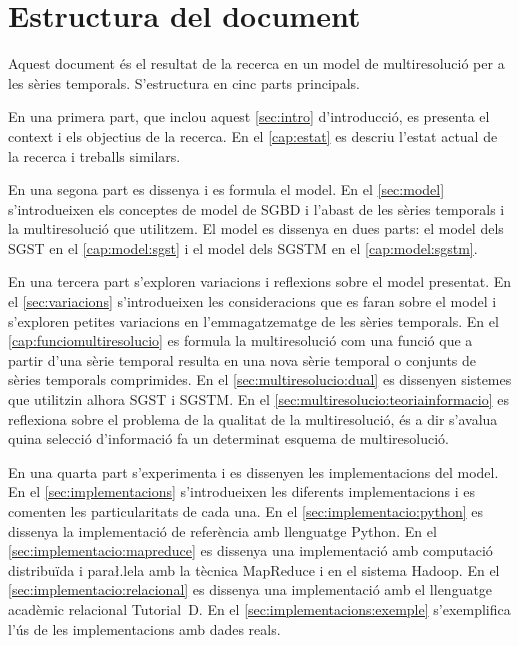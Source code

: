 











\section{Estructura del document}


Aquest document és el resultat de la recerca en un
model de multiresolució per a les sèries temporals. S'estructura en
cinc parts principals.

En una primera part, que inclou aquest \autoref{sec:intro}
d'introducció, es presenta el context i els objectius de la
recerca. En el \autoref{cap:estat} es descriu l'estat actual de la
recerca i treballs similars.

En una segona part es dissenya i es formula el model.  En el
\autoref{sec:model} s'introdueixen els conceptes de model de
\gls{SGBD} i l'abast de les sèries temporals i la multiresolució que
utilitzem.  El model es dissenya en dues parts: el model dels
\gls{SGST} en el \autoref{cap:model:sgst} i el model dels \gls{SGSTM}
en el \autoref{cap:model:sgstm}.


En una tercera part s'exploren variacions i reflexions sobre el model
presentat. En el \autoref{sec:variacions} s'introdueixen les
consideracions que es faran sobre el model i s'exploren petites
variacions en l'emmagatzematge de les sèries temporals. En el
\autoref{cap:funciomultiresolucio} es formula la multiresolució com
una funció que a partir d'una sèrie temporal resulta en una nova sèrie
temporal o conjunts de sèries temporals comprimides. En el
\autoref{sec:multiresolucio:dual} es dissenyen sistemes que utilitzin
alhora \gls{SGST} i \gls{SGSTM}.  En el
\autoref{sec:multiresolucio:teoriainformacio} es reflexiona sobre el
problema de la qualitat de la multiresolució, és a dir s'avalua quina
selecció d'informació fa un determinat esquema de multiresolució.



En una quarta part s'experimenta i es dissenyen les implementacions
del model. En el \autoref{sec:implementacions} s'introdueixen les
diferents implementacions i es comenten les particularitats de cada
una. En el \autoref{sec:implementacio:python} es dissenya la
implementació de referència amb llenguatge Python. En el
\autoref{sec:implementacio:mapreduce} es dissenya una implementació
amb computació distribuïda i para\l.lela amb la tècnica MapReduce i en
el sistema Hadoop. En el \autoref{sec:implementacio:relacional} es
dissenya una implementació amb el llenguatge acadèmic relacional
Tutorial~D. En el \autoref{sec:implementacions:exemple} s'exemplifica
l'ús de les implementacions amb dades reals.


